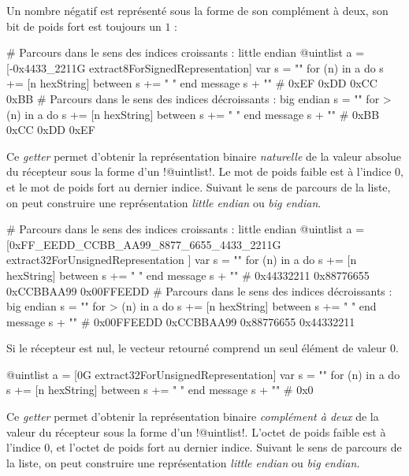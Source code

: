 Un nombre négatif est représenté sous la forme de son complément à deux, son bit de poids fort est toujours un $1$ : 

\begin{galgas}
# Parcours dans le sens des indices croissants : little endian
@uintlist a = [-0x4433_2211G extract8ForSignedRepresentation]
var s = ""
for (n) in a
  do s += [n hexString]
  between s += " "
end
message s + "\n" # 0xEF 0xDD 0xCC 0xBB
# Parcours dans le sens des indices décroissants : big endian
s = ""
for > (n) in a
  do s += [n hexString]
  between s += " "
end
message s + "\n" # 0xBB 0xCC 0xDD 0xEF
\end{galgas}


Ce \emph{getter} permet d'obtenir la représentation binaire \emph{naturelle} de la valeur absolue du récepteur sous la forme d'un \ggs!@uintlist!. Le mot de poids faible est à l'indice $0$, et le mot de poids fort au dernier indice. Suivant le sens de parcours de la liste, on peut construire une représentation \emph{little endian} ou \emph{big endian}.

\begin{galgas}
# Parcours dans le sens des indices croissants : little endian
@uintlist a = [0xFF_EEDD_CCBB_AA99_8877_6655_4433_2211G
  extract32ForUnsignedRepresentation
]
var s = ""
for (n) in a
  do s += [n hexString]
  between s += " "
end
message s + "\n" # 0x44332211 0x88776655 0xCCBBAA99 0x00FFEEDD 
# Parcours dans le sens des indices décroissants : big endian
s = ""
for > (n) in a
  do s += [n hexString]
  between s += " "
end
message s + "\n" # 0x00FFEEDD 0xCCBBAA99 0x88776655 0x44332211
\end{galgas}

Si le récepteur est nul, le vecteur retourné comprend un seul élément de valeur $0$.

\begin{galgas}
@uintlist a = [0G extract32ForUnsignedRepresentation]
var s = ""
for (n) in a
  do s += [n hexString]
  between s += " "
end
message s + "\n" # 0x0
\end{galgas}





Ce \emph{getter} permet d'obtenir la représentation binaire \emph{complément à deux} de la valeur du récepteur sous la forme d'un \ggs!@uintlist!. L'octet de poids faible est à l'indice $0$, et l'octet de poids fort au dernier indice. Suivant le sens de parcours de la liste, on peut construire une représentation \emph{little endian} ou \emph{big endian}.

